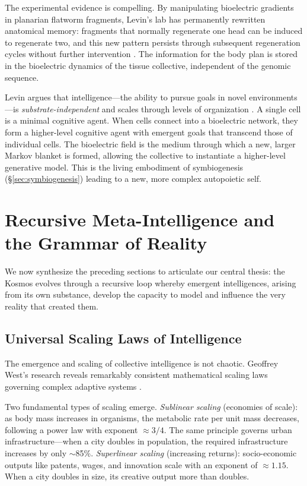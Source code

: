 \documentclass[12pt,a4paper]{article}
\begin{document}
The experimental evidence is compelling.  By manipulating bioelectric
gradients in planarian flatworm fragments, Levin's lab has permanently
rewritten anatomical memory: fragments that normally regenerate one head
can be induced to regenerate two, and this new pattern persists through
subsequent regeneration cycles without further intervention
\citep{oviedo2010,emmons2015}.  The information for the body plan is
stored in the bioelectric dynamics of the tissue collective, independent
of the genomic sequence.

Levin argues that intelligence---the ability to pursue goals in novel
environments---is \emph{substrate-independent} and scales through levels
of organization \citep{levin2023}.  A single cell is a minimal cognitive
agent.  When cells connect into a bioelectric network, they form a
higher-level cognitive agent with emergent goals that transcend those of
individual cells.  The bioelectric field is the medium through which a new,
larger Markov blanket is formed, allowing the collective to instantiate a
higher-level generative model.  This is the living embodiment of
symbiogenesis (\S\ref{sec:symbiogenesis}) leading to a new, more complex
autopoietic self.


\section{Recursive Meta-Intelligence and the Grammar of Reality}
\label{sec:recursive}

We now synthesize the preceding sections to articulate our central thesis:
the Kosmos evolves through a recursive loop whereby emergent intelligences,
arising from its own substance, develop the capacity to model and influence
the very reality that created them.

\subsection{Universal Scaling Laws of Intelligence}
\label{sec:scaling}

The emergence and scaling of collective intelligence is not chaotic.
Geoffrey West's research reveals remarkably consistent mathematical scaling
laws governing complex adaptive systems \citep{west2017,bettencourt2007}.

Two fundamental types of scaling emerge.  \emph{Sublinear scaling}
(economies of scale): as body mass increases in organisms, the metabolic
rate per unit mass decreases, following a power law with exponent
$\approx 3/4$.  The same principle governs urban infrastructure---when a
city doubles in population, the required infrastructure increases by only
$\sim$85\%.  \emph{Superlinear scaling} (increasing returns): socio-economic
outputs like patents, wages, and innovation scale with an exponent of
$\approx 1.15$.  When a city doubles in size, its creative output more
than doubles.
\end{document}
